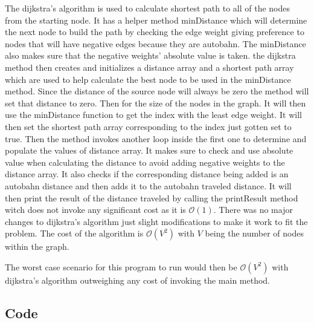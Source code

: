 \documentclass[11pt]{article}
\begin{document}
The dijkstra's algorithm is used to calculate shortest path to all of the nodes from the starting node. It has a helper method minDistance which will determine the next node to build the path by checking the edge weight giving preference to nodes that will have negative edges because they are autobahn. The minDistance also makes sure that the negative weights' absolute value is taken. the dijkstra method then creates and initializes a distance array and a shortest path array which are used to help calculate the best node to be used in the minDistance method. Since the distance of the source node will always be zero the method will set that distance to zero. Then for the size of the nodes in the graph. It will then use the minDistance function to get the index with the least edge weight. It will then set the shortest path array corresponding to the index just gotten set to true. Then the method invokes another loop inside the first one to determine and populate the values of distance array. It makes sure to check and use absolute value when calculating the distance to avoid adding negative weights to the distance array. It also checks if the corresponding distance being added is an autobahn distance and then adds it to the autobahn traveled distance. It will then print the result of the distance traveled by calling the printResult method witch does not invoke any significant cost as it is $\mathcal{O}(1)$. There was no major changes to dijkstra's algorithm just slight modifications to make it work to fit the problem. The cost of the algorithm is $\mathcal{O}(V^2)$ with $V$ being the number of nodes within the graph. 
 
The worst case scenario for this program to run would then be $\mathcal{O}(V^2)$ with dijkstra's algorithm outweighing any cost of invoking the main method.   

\subsection{Code}
\end{document}

